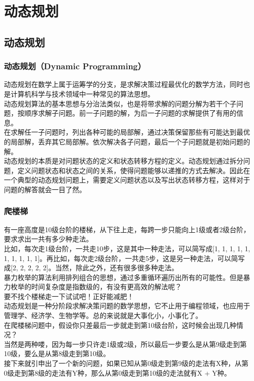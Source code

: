\chapter{动态规划}

\section{动态规划}

\subsection{动态规划（Dynamic Programming）}

动态规划在数学上属于运筹学的分支，是求解决策过程最优化的数学方法，同时也是计算机科学与技术领域中一种常见的算法思想。 \\

动态规划算法的基本思想与分治法类似，也是将带求解的问题分解为若干个子问题，按顺序求解子问题。前一子问题的解，为后一子问题的求解提供了有用的信息。 \\

在求解任一子问题时，列出各种可能的局部解，通过决策保留那些有可能达到最优的局部解，丢弃其它局部解。依次解决各子问题，最后一个子问题就是初始问题的解。 \\

动态规划的本质是对问题状态的定义和状态转移方程的定义。动态规划通过拆分问题，定义问题状态和状态之间的关系，使得问题能够以递推的方式去解决。因此在一个典型的动态规划问题上，需要定义问题状态以及写出状态转移方程，这样对于问题的解答就会一目了然。

\subsection{爬楼梯}

有一座高度是10级台阶的楼梯，从下往上走，每跨一步只能向上1级或者2级台阶，要求求出一共有多少种走法。 \\

比如，每次走1级台阶，一共走10步，这是其中一种走法，可以简写成[1, 1, 1, 1, 1, 1, 1, 1, 1, 1]。再比如，每次走2级台阶，一共走5步，这是另一种走法，可以简写成[2, 2, 2, 2, 2]。当然，除此之外，还有很多很多种走法。 \\

暴力枚举的算法利用排列组合的思想，通过多重循环遍历出所有的可能性。但是暴力枚举的时间复杂度是指数级的，有没有更高效的解法呢？ \\

要不找个楼梯走一下试试吧！正好能减肥！ \\

动态规划是一种分阶段求解决策问题的数学思想，它不止用于编程领域，也应用于管理学、经济学、生物学等。总的来说就是大事化小，小事化了。 \\

在爬楼梯问题中，假设你只差最后一步就走到第10级台阶，这时候会出现几种情况？ \\

当然是两种喽，因为每一步只许走1级或2级，所以最后一步要么是从第9级走到第10级，要么是从第8级走到第10级。 \\

接下来就引申出了一个新的问题，如果已知从第0级走到第9级的走法有X种，从第0级走到第8级的走法有Y种，那么从第0级走到第10级的走法就有X + Y种。 \\

